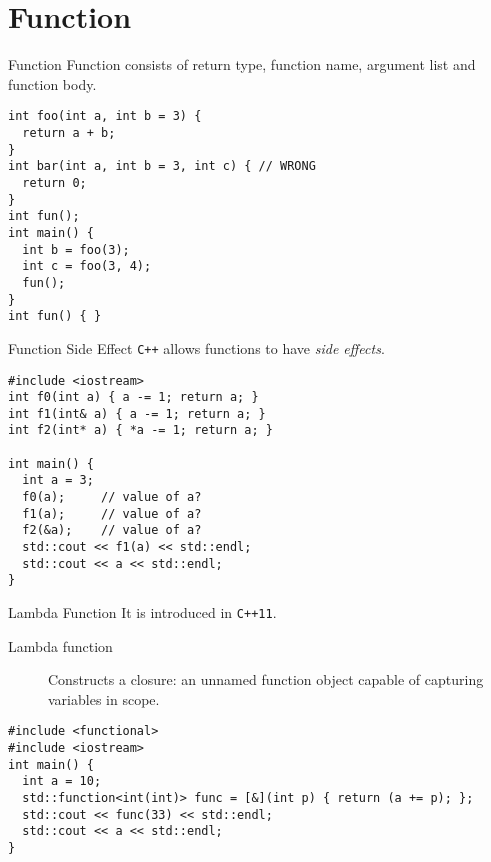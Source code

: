 \documentclass[presentation]{beamer}
\begin{document}
\section{Function}
\label{sec:orgheadline52}

\begin{frame}[fragile,label={sec:orgheadline40}]{Function}
 Function consists of return type, function name, argument list and
function body.

\begin{verbatim}
int foo(int a, int b = 3) {
  return a + b;
}
int bar(int a, int b = 3, int c) { // WRONG
  return 0;
}
int fun();
int main() {
  int b = foo(3);
  int c = foo(3, 4);
  fun();
}
int fun() { }
\end{verbatim}
\end{frame}

\begin{frame}[fragile,label={sec:orgheadline41}]{Function Side Effect}
 \texttt{C++} allows functions to have \emph{side effects}.

\begin{verbatim}
#include <iostream>
int f0(int a) { a -= 1; return a; }
int f1(int& a) { a -= 1; return a; }
int f2(int* a) { *a -= 1; return a; }

int main() {
  int a = 3;
  f0(a);     // value of a?
  f1(a);     // value of a?
  f2(&a);    // value of a?
  std::cout << f1(a) << std::endl;
  std::cout << a << std::endl;
}
\end{verbatim}
\end{frame}

\begin{frame}[fragile,label={sec:orgheadline42}]{Lambda Function}
 It is introduced in \texttt{C++11}.
\begin{description}
\item[{Lambda function}] Constructs a closure: an unnamed function
object capable of capturing variables in scope.
\end{description}

\begin{verbatim}
#include <functional>
#include <iostream>
int main() {
  int a = 10;
  std::function<int(int)> func = [&](int p) { return (a += p); };
  std::cout << func(33) << std::endl;
  std::cout << a << std::endl;
}
\end{verbatim}
\end{frame}
\end{document}
